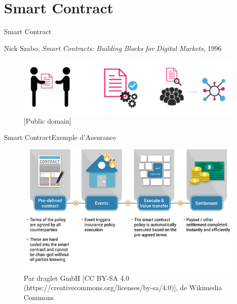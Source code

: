 \documentclass[xcolor=dvipsnames]{beamer}
\begin{document}
\section{Smart Contract}

\begin{frame}{Smart Contract}
	
	
	\begin{center}
		Nick Szabo, \textit{Smart Contracts: Building Blocks for Digital Markets}, 1996
	\end{center}		
	
	\begin{figure}
		\centering
		\includegraphics[scale=.25]{smart_contract}
		\caption{[Public domain]}
	\end{figure}
	
	
\end{frame}

\begin{frame}{Smart Contract}{Exemple d'Assurance}

	\begin{figure}
		\centering
		\includegraphics[scale=.48]{insurance_contract}
		\caption{Par draglet GmbH [CC BY-SA 4.0 (https://creativecommons.org/licenses/by-sa/4.0)], de Wikimedia Commons}
	\end{figure}

\end{frame}
\end{document}
